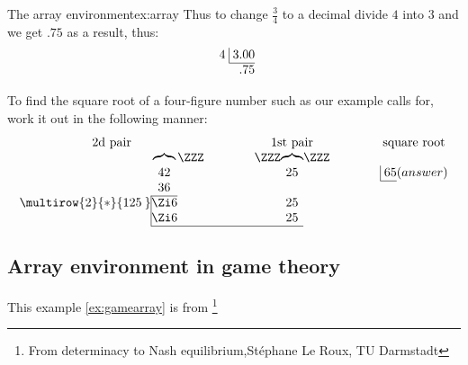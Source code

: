 \begin{texexample}{The array environment}{ex:array}
Thus to change $\frac34$ to a decimal divide $4$ into $3$
and we get $.75$ as a result, thus:
\[
\begin{array}{r@{}r@{}}
4 \; & \vline \; 3.00 \\\cline{2-2}
     &            .75
\end{array}
\]

To find the square root of a four-figure number
such as our example calls for, work it out in the
following manner:
\[
\arraycolsep=0em
\begin{array}{cccccccccccc}
\multicolumn{3}{c}{\text{2d pair}} &\qquad&\qquad&
\multicolumn{3}{c}{\text{1st pair}}&\qquad&\qquad&
\multicolumn{2}{c}{\text{square root}}\\
 & \overbrace{\quad}&\ZZZ&&&\ZZZ&\overbrace{\quad}&\ZZZ\\
 & 42 &&&&& 25 &&&&\vline\;65&(answer)\\\cline{11-11}
 & 36 &&&&& \\\cline{2-2}
\multirow{2}{*}{125\:} & \vline\hfill \Zi6 \hfill&&&&& 25\\
 & \vline\hfill \Zi6 \hfill&&&&& 25\\\cline{2-7}
\end{array}
\]
\end{texexample}


\subsection{Array environment in game theory}

This example \ref{ex:gamearray} is from \footnote{From determinacy to Nash equilibrium,St\'ephane Le Roux, TU Darmstadt }

